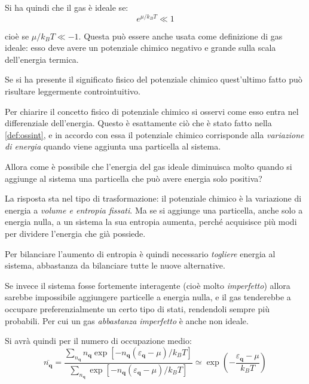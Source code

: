 Si ha quindi che il gas è ideale se:
\begin{equation*}
e^{\mu/k_B T} \ll 1
\end{equation*}

cioè se $\mu/k_B T \ll -1$. Questa può essere anche usata come definizione di gas ideale: esso deve avere un potenziale chimico negativo e grande sulla scala dell'energia termica.

\begin{oss}
	Se si ha presente il significato fisico del potenziale chimico quest'ultimo fatto può risultare leggermente controintuitivo.
	
	Per chiarire il concetto fisico di potenziale chimico si osservi come esso entra nel differenziale dell'energia. Questo è esattamente ciò che è stato fatto nella \cref{def:ossint}, e in accordo con essa il potenziale chimico corrisponde alla \textit{variazione di energia} quando viene aggiunta una particella al sistema.
	
	Allora come è possibile che l'energia del gas ideale diminuisca molto quando si aggiunge al sistema una particella che può avere energia solo positiva?
	
	\noindent La risposta sta nel tipo di trasformazione: il potenziale chimico è la variazione di energia a \textit{volume e entropia fissati}. Ma se si aggiunge una particella, anche solo a energia nulla, a un sistema la sua entropia aumenta, perché acquisisce più modi per dividere l'energia che già possiede.
	
	\noindent Per bilanciare l'aumento di entropia è quindi necessario \textit{togliere} energia al sistema, abbastanza da bilanciare tutte le nuove alternative.
	
	Se invece il sistema fosse fortemente interagente (cioè molto \textit{imperfetto}) allora sarebbe impossibile aggiungere particelle a energia nulla, e il gas tenderebbe a occupare preferenzialmente un certo tipo di stati, rendendoli sempre più probabili. Per cui un gas \textit{abbastanza imperfetto} è anche non ideale.
\end{oss}

Si avrà quindi per il numero di occupazione medio:
\begin{equation*}
	\overline{n_{\textbf{q}}} = \frac{\sum_{n_{\textbf{q}}} n_{\textbf{q}}\exp [ - {n_{\textbf{q}}{(\varepsilon_{\textbf{q}} - \mu)}}/{k_B T}]}{\sum_{n_{\textbf{q}}} \exp [ - {n_{\textbf{q}}{(\varepsilon_{\textbf{q}} - \mu)}}/{k_B T}]} \simeq \exp \left( - \frac{{\varepsilon_{\textbf{q}} - \mu}}{k_B T}\right)
\end{equation*}

